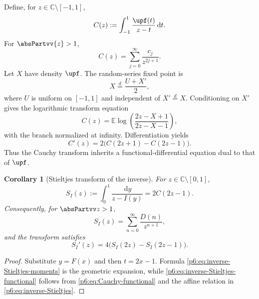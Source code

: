 \documentclass[11pt,oneside]{article}
\newtheorem{corollary}[theorem]{Corollary}
\theoremstyle{definition}
\theoremstyle{remark}
\newcommand{\E}{\mathbb E}
\newcommand{\C}{\mathbb C}
\newcommand{\dd}{\,\mathrm d}
\newcommand{\1}{\mathbf 1}
\begin{document}
Define, for \(z\in\C\setminus[-1,1]\),
\begin{equation}
 C(z):=\int_{-1}^1\frac{\upf(t)}{z-t}\dd t.               \label{p6:eq:Cauchy-def}
\end{equation}
For \(\absPartvv{z}>1\),
\begin{equation}
 C(z)=\sum_{j=0}^{\infty}\frac{c_j}{z^{2j+1}}.            \label{p6:eq:Cauchy-moment}
\end{equation}
Let \(X\) have density \(\upf\).  The random-series fixed point is
\begin{equation}
 X\stackrel{d}{=}\frac{U+X'}2,                               \label{p6:eq:random-fixed-point}
\end{equation}
where \(U\) is uniform on \([-1,1]\) and independent of \(X'\stackrel{d}{=}X\).
Conditioning on \(X'\) gives the logarithmic transform equation
\begin{equation}
 \boxed{
 C(z)=\E\log\!\left(\frac{2z-X+1}{2z-X-1}\right),
 }                                                        \label{p6:eq:Cauchy-log}
\end{equation}
with the branch normalized at infinity.  Differentiation yields
\begin{equation}
 C'(z)=2\bigl(C(2z+1)-C(2z-1)\bigr).                     \label{p6:eq:Cauchy-functional}
\end{equation}
Thus the Cauchy transform inherits a functional-differential equation dual to that of
\(\upf\).

\begin{corollary}[Stieltjes transform of the inverse]
\label{p6:cor:inverse-Stieltjes}
For \(z\in\C\setminus[0,1]\),
\begin{equation}
 \boxed{
 S_I(z):=\int_0^1\frac{\dd y}{z-I(y)}=2C(2z-1).
 }                                                          \label{p6:eq:inverse-Stieltjes}
\end{equation}
Consequently, for \(\absPartvv z>1\),
\begin{equation}
 S_I(z)=\sum_{n=0}^{\infty}\frac{D(n)}{z^{n+1}},           \label{p6:eq:inverse-Stieltjes-moments}
\end{equation}
and the transform satisfies
\begin{equation}
 S_I'(z)=4\bigl(S_I(2z)-S_I(2z-1)\bigr).                  \label{p6:eq:inverse-Stieltjes-functional}
\end{equation}
\end{corollary}

\begin{proof}
Substitute \(y=F(x)\) and then \(t=2x-1\).  Formula
\eqref{p6:eq:inverse-Stieltjes-moments} is the geometric expansion, while
\eqref{p6:eq:inverse-Stieltjes-functional} follows from
\eqref{p6:eq:Cauchy-functional} and the affine relation in
\eqref{p6:eq:inverse-Stieltjes}.
\end{proof}
\end{document}
